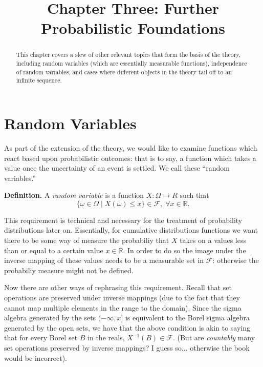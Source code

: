 \documentclass{article}
\begin{document}
\title{Chapter Three: Further Probabilistic Foundations}

\maketitle

\medskip 


\begin{abstract}

\noindent This chapter covers a slew of other relevant topics that form the basis of the theory, including random variables (which are essentially measurable functions), independence of random variables, and cases where different objects in the theory tail off to an infinite sequence. 

\end{abstract}

\bigskip

\section{Random Variables}

As part of the extension of the theory, we would like to examine functions which react based upon probabilistic outcomes: that is to say, a function which takes a value once the uncertainty of an event is settled. We call these ``random variables.''

\medskip

\noindent \textbf{Definition.} A \emph{random variable} is a function $X: \Omega \to R$ such that \[\{ \omega \in \Omega \mid X(\omega) \leq x \} \in \mathcal{F}, \; \forall x \in \mathbb{R}.\]

\medskip

This requirement is technical and necessary for the treatment of probability distributions later on. Essentially, for cumulative distributions functions we want there to be some way of measure the probabiliy that $X$ takes on a values less than or equal to a certain value $x \in \mathbb{R}$. In order to do so the image under the inverse mapping of these values needs to be a measurable set in $\mathcal{F}$: otherwise the probabiliy measure might not be defined. 

Now there are other ways of rephrasing this requirement. Recall that set operations are preserved under inverse mappings (due to the fact that they cannot map multiple elements in the range to the domain). Since the sigma algebra generated by the sets $(-\infty, x]$ is equivalent to the Borel sigma algebra generated by the open sets, we have that the above condition is akin to saying that for every Borel set $B$ in the reals, $X^{-1}(B) \in \mathcal{F}$. (But are \emph{countably} many set operations preserved by inverse mappings? I guess so... otherwise the book would be incorrect).
\end{document}
